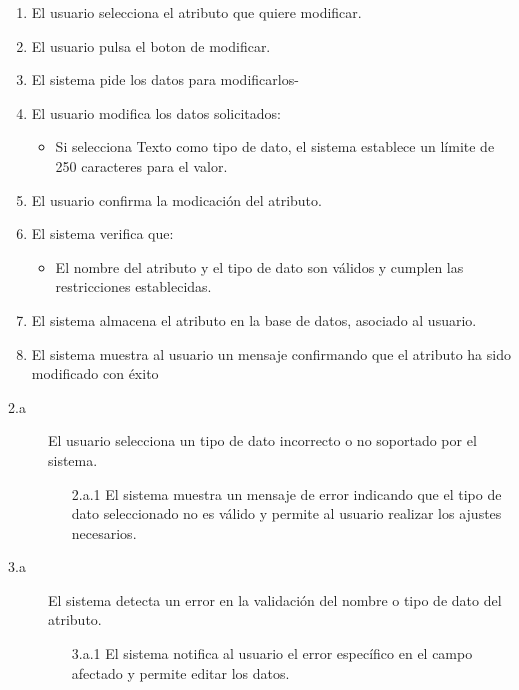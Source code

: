 \begin{enumerate}
    \item El usuario selecciona el atributo que quiere modificar.
    \item El usuario pulsa el boton de modificar.
    \item El sistema pide los datos para modificarlos-
    \item El usuario modifica los datos solicitados:
    \begin{itemize}
        \item Si selecciona Texto como tipo de dato, el sistema establece un límite de 250 caracteres para el valor.
    \end{itemize}
    \item El usuario confirma la modicación del atributo.
    \item El sistema verifica que:
    \begin{itemize}
        \item El nombre del atributo y el tipo de dato son válidos y cumplen las restricciones establecidas.
    \end{itemize}
    \item El sistema almacena el atributo en la base de datos, asociado al usuario.
    \item El sistema muestra al usuario un mensaje confirmando que el atributo ha sido modificado con éxito
\end{enumerate}

\begin{description}
    \item[2.a] El usuario selecciona un tipo de dato incorrecto o no soportado por el sistema.
    \begin{enumerate}
        \item[2.a.1] El sistema muestra un mensaje de error indicando que el tipo de dato seleccionado no es válido y permite al usuario realizar los ajustes necesarios.
    \end{enumerate}

    \item[3.a] El sistema detecta un error en la validación del nombre o tipo de dato del atributo.
    \begin{enumerate}
        \item[3.a.1] El sistema notifica al usuario el error específico en el campo afectado y permite editar los datos.
    \end{enumerate}
\end{description}

